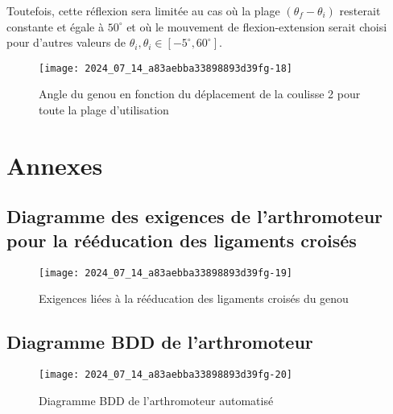 Toutefois, cette réflexion sera limitée au cas où la plage $\left(\theta_{f}-\theta_{i}\right)$ resterait constante et égale à $50^{\circ}$ et où le mouvement de flexion-extension serait choisi pour d'autres valeurs de $\theta_{i}, \theta_{i} \in\left[-5^{\circ}, 60^{\circ}\right]$.




\begin{figure}[!h]\centering
\texttt{[image: 2024\_07\_14\_a83aebba33898893d39fg-18]}
\caption{\label{fig:ccs_mp_2024:fig:30}Angle du genou en fonction du déplacement de la coulisse 2 pour toute la plage d'utilisation}
\end{figure}

\clearpage
\newpage

\section{Annexes}
\subsection{Diagramme des exigences de l'arthromoteur pour la rééducation des ligaments croisés}

\begin{figure}[!h]\centering
\texttt{[image: 2024\_07\_14\_a83aebba33898893d39fg-19]}
\caption{\label{fig:ccs_mp_2024:fig:31}Exigences liées à la rééducation des ligaments croisés du genou}
\end{figure}

\newpage

\subsection{Diagramme BDD de l'arthromoteur}
\begin{figure}[!h]\centering
\texttt{[image: 2024\_07\_14\_a83aebba33898893d39fg-20]}
\caption{\label{fig:ccs_mp_2024:fig:32}Diagramme BDD de l'arthromoteur automatisé}
\end{figure}
\newpage

